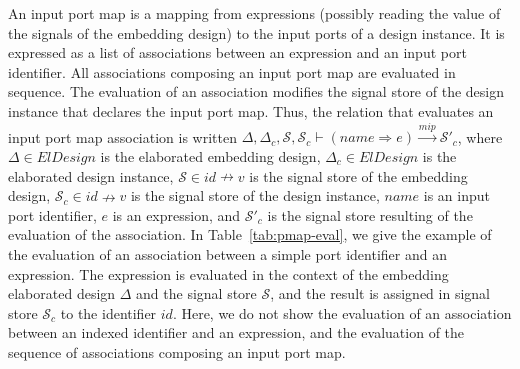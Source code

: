 \begin{table}[!h]


\end{table}

An input port map is a mapping from expressions (possibly reading the
value of the signals of the embedding design) to the input ports of a
design instance. It is expressed as a list of associations between an
expression and an input port identifier.  All associations composing
an input port map are evaluated in sequence.  The evaluation of an
association modifies the signal store of the design instance that
declares the input port map. Thus, the relation that evaluates an
input port map association is written
$\Delta,\Delta_c,\mathcal{S},\mathcal{S}_c\vdash{}(name\Rightarrow{}e)\xrightarrow{mip}\mathcal{S}'_c$,
where $\Delta\in{}ElDesign$ is the elaborated embedding design,
$\Delta_c\in{}ElDesign$ is the elaborated design instance,
$\mathcal{S}\in{}id\nrightarrow{}v$ is the signal store of the
embedding design, $\mathcal{S}_c\in{}id\nrightarrow{}v$ is the signal
store of the design instance, $name$ is an input port identifier, $e$
is an expression, and $\mathcal{S}'_c$ is the signal store resulting
of the evaluation of the association. In Table~\ref{tab:pmap-eval}, we
give the example of the evaluation of an association between a simple
port identifier and an expression. The expression is evaluated in the
context of the embedding elaborated design $\Delta$ and the signal
store $\mathcal{S}$, and the result is assigned in signal store
$\mathcal{S}_c$ to the identifier $id$. Here, we do not show the
evaluation of an association between an indexed identifier and an
expression, and the evaluation of the sequence of associations
composing an input port map.

